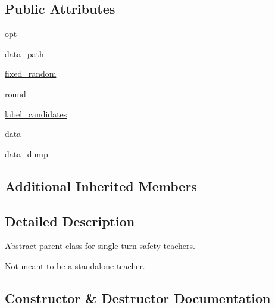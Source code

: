 \subsection*{Public Attributes}
\begin{DoxyCompactItemize}
\item 
\hyperlink{classparlai_1_1tasks_1_1dialogue__safety_1_1base__agent_1_1__BaseSafetyTeacher_a72d5420bf860ece2469f704aff6a4741}{opt}
\item 
\hyperlink{classparlai_1_1tasks_1_1dialogue__safety_1_1base__agent_1_1__BaseSafetyTeacher_acc01c5943e88188386156bee04df64cd}{data\+\_\+path}
\item 
\hyperlink{classparlai_1_1tasks_1_1dialogue__safety_1_1base__agent_1_1__BaseSafetyTeacher_ac288768013bb6f6eae5b6d54e6038c97}{fixed\+\_\+random}
\item 
\hyperlink{classparlai_1_1tasks_1_1dialogue__safety_1_1base__agent_1_1__BaseSafetyTeacher_a3de49870b976f3f356d43d18bdee3206}{round}
\item 
\hyperlink{classparlai_1_1tasks_1_1dialogue__safety_1_1base__agent_1_1__BaseSafetyTeacher_a5f12c3a58104bcbe47d921c5fc74f571}{label\+\_\+candidates}
\item 
\hyperlink{classparlai_1_1tasks_1_1dialogue__safety_1_1base__agent_1_1__BaseSafetyTeacher_aa6fcadfe3658452b2ec1d1ab7fba050e}{data}
\item 
\hyperlink{classparlai_1_1tasks_1_1dialogue__safety_1_1base__agent_1_1__BaseSafetyTeacher_aa689aab73ec3cfd0047bb8ec694893b3}{data\+\_\+dump}
\end{DoxyCompactItemize}
\subsection*{Additional Inherited Members}


\subsection{Detailed Description}
\begin{DoxyVerb}Abstract parent class for single turn safety teachers.

Not meant to be a standalone teacher.
\end{DoxyVerb}
 

\subsection{Constructor \& Destructor Documentation}
\mbox{\label{classparlai_1_1tasks_1_1dialogue__safety_1_1base__agent_1_1__BaseSafetyTeacher_a30315340193b3ddc6edde594193b3325}} 
